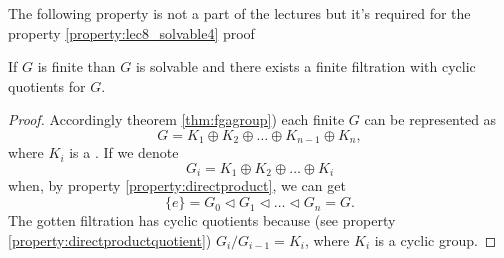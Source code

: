 The following property is not a part of the lectures but it's required
for the property \ref{property:lec8_solvable4} proof
\begin{property}
  If $G$ is finite  than $G$ is solvable and
  there exists a finite filtration with cyclic quotients for $G$.
  \begin{proof}
    Accordingly theorem \ref{thm:fgagroup}) each finite
     $G$ can be represented as
    \[
    G = K_1 \oplus K_2 \oplus \dots \oplus K_{n-1} \oplus K_n,
    \]
    where $K_i$ is a . If we denote
    \[
    G_i = K_1 \oplus K_2 \oplus \dots \oplus K_{i} 
    \]
    when, by property \ref{property:directproduct}, we can get
    \[
    \{e\} = G_0 \triangleleft G_1 \triangleleft \dots \triangleleft
    G_n = G.
    \]
    The gotten filtration has cyclic quotients because
    (see property \ref{property:directproductquotient})
    $G_i/G_{i-1} = K_i$, where $K_i$ is a cyclic group.
  \end{proof}
  \label{property:lec8_solvable4add}
\end{property}

